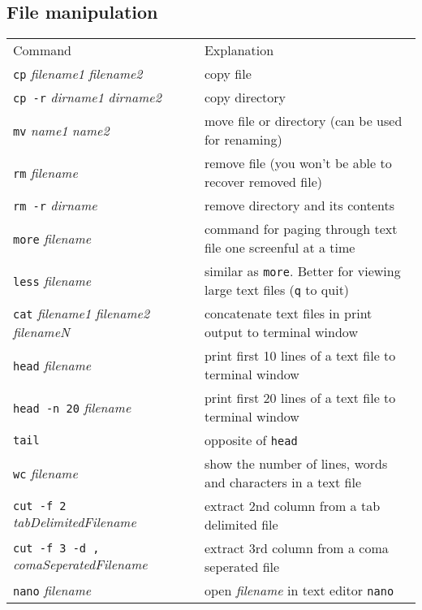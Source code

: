 \documentclass{article}
\begin{document}
\subsection{File manipulation}
\begin{tabular}{ll}
  Command & Explanation \\
  \hhline{==}
  \texttt{cp} \textit{filename1} \textit{filename2} & copy file \\
  \texttt{cp -r} \textit{dirname1} \textit{dirname2} & copy directory \\
  \texttt{mv} \textit{name1} \textit{name2} & move file or directory (can be used for renaming) \\
  \texttt{rm} \textit{filename} & remove file (you won't be able to recover removed file) \\
  \texttt{rm -r} \textit{dirname} & remove directory and its contents \\
  \texttt{more} \textit{filename} & command for paging through text file one screenful at a time \\%
  \texttt{less} \textit{filename} & similar as \texttt{more}. Better for viewing large text files (\texttt{q} to quit) \\
  \texttt{cat} \textit{filename1 filename2 filenameN} & concatenate text files in print output to terminal window \\
  \texttt{head} \textit{filename} & print first 10 lines of a text file to terminal window \\
  \texttt{head -n 20} \textit{filename} &  print first 20 lines of a text file to terminal window \\
  \texttt{tail} & opposite of \texttt{head} \\
  \texttt{wc} \textit{filename} & show the number of lines, words and characters in a text file \\
  \texttt{cut -f 2} \textit{tabDelimitedFilename} & extract 2nd column from a tab delimited file \\
  \texttt{cut -f 3 -d ,} \textit{comaSeperatedFilename} & extract 3rd column from a coma seperated file \\
  \texttt{nano} \textit{filename} & open \textit{filename} in text editor \texttt{nano} \\
\end{tabular}
\end{document}
